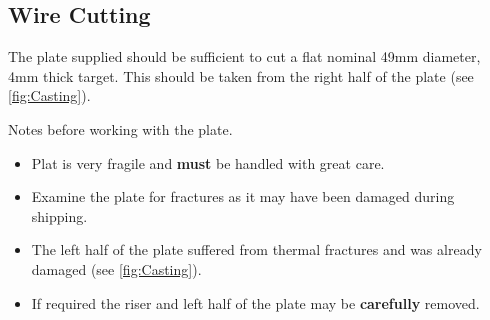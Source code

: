\subsection{Wire Cutting}
The plate supplied should be sufficient to cut a flat nominal 49mm diameter, 4mm thick target. This should be taken from the right half of the plate (see \ref{fig:Casting}). 

Notes before working with the plate.
\begin{itemize}
\item Plat is very fragile and \textbf{must} be handled with great care. 
\item Examine the plate for fractures as it may have been damaged during shipping. 
\item The left half of the plate suffered from thermal fractures and was already damaged (see \ref{fig:Casting}). 
\item If required the riser and left half of the plate may be \textbf{carefully} removed.
\end{itemize}